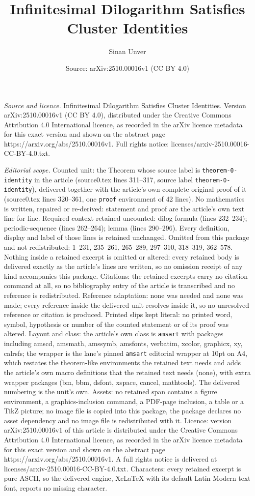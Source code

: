 \documentclass[10pt,a4paper]{amsart}
\title[Infinitesimal Dilogarithm Satisfies Cluster Identities]{Infinitesimal Dilogarithm Satisfies Cluster Identities}
\author{Sinan Unver}
\date{Source: arXiv:2510.00016v1 (CC BY 4.0)}
\begin{document}
\maketitle

\noindent\emph{Source and licence.} Infinitesimal Dilogarithm Satisfies Cluster Identities. Version arXiv:2510.00016v1 (CC BY 4.0), distributed under the Creative Commons Attribution 4.0 International licence, as recorded in the arXiv licence metadata for this exact version and shown on the abstract page https://arxiv.org/abs/2510.00016v1. Full rights notice: licenses/arxiv-2510.00016-CC-BY-4.0.txt.\par\smallskip

\noindent\textit{Editorial scope.} Counted unit: the Theorem whose source label is \texttt{theorem-0-identity} in the article (source0.tex lines 311--317, source label \texttt{theorem-0-identity}), delivered together with the article's own complete original proof of it (source0.tex lines 320--361, one \texttt{proof} environment of 42 lines). No mathematics is written, repaired or re-derived: statement and proof are the article's own text line for line. Required context retained uncounted: dilog-formula (lines 232--234); periodic-sequence (lines 262--264); lemma (lines 290--296). Every definition, display and label of those lines is retained unchanged. Omitted from this package and not redistributed: 1--231, 235--261, 265--289, 297--310, 318--319, 362--578. Nothing inside a retained excerpt is omitted or altered: every retained body is delivered exactly as the article's lines are written, so no omission receipt of any kind accompanies this package. Citations: the retained excerpts carry no citation command at all, so no bibliography entry of the article is transcribed and no reference is redistributed. Reference adaptation: none was needed and none was made; every reference inside the delivered unit resolves inside it, so no unresolved reference or citation is produced. Printed slips kept literal: no printed word, symbol, hypothesis or number of the counted statement or of its proof was altered. Layout and class: the article's own class is \texttt{amsart} with packages including amscd, amsmath, amssymb, amsfonts, verbatim, xcolor, graphicx, xy, calrsfs; the wrapper is the lane's pinned \texttt{amsart} editorial wrapper at 10pt on A4, which restates the theorem-like environments the retained text needs and adds the article's own macro definitions that the retained text needs (none), with extra wrapper packages (bm, bbm, dsfont, xspace, cancel, mathtools). The delivered numbering is the unit's own. Assets: no retained span contains a figure environment, a graphics-inclusion command, a PDF-page inclusion, a table or a TikZ picture; no image file is copied into this package, the package declares no asset dependency and no image file is redistributed with it. Licence: version arXiv:2510.00016v1 of this article is distributed under the Creative Commons Attribution 4.0 International licence, as recorded in the arXiv licence metadata for this exact version and shown on the abstract page https://arxiv.org/abs/2510.00016v1. A full rights notice is delivered at licenses/arxiv-2510.00016-CC-BY-4.0.txt. Characters: every retained excerpt is pure ASCII, so the delivered engine, XeLaTeX with its default Latin Modern text font, reports no missing character.
\end{document}
